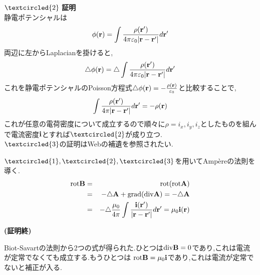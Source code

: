 \documentclass[../main]{subfiles}
\begin{document}
$\textcircled{\scriptsize2}$ {\bf 証明} \\
静電ポテンシャルは
\begin{eqnarray*}
\phi ({\bf r})= \int \frac{\rho({\bf r'})}{4 \pi \varepsilon_0 |{\bf r}-{\bf r'}|}d{\bf r'}
\end{eqnarray*}
両辺に左からLaplacianを掛けると,
\begin{eqnarray*}
\triangle \phi ({\bf r})= \triangle \int \frac{\rho({\bf r'})}{4 \pi \varepsilon_0 |{\bf r}-{\bf r'}|}d{\bf r'}
\end{eqnarray*}
これを静電ポテンシャルのPoisson方程式$\triangle \phi({\bf r}) = - \frac{\rho({\bf r})}{\varepsilon_0}$と比較することで,
\begin{eqnarray*}
\int \frac{\rho({\bf r'})}{4 \pi |{\bf r}-{\bf r'}|}d{\bf r'}= - \rho ({\bf r})
\end{eqnarray*}
これが任意の電荷密度について成立するので順々に$\rho=i_x,i_y,i_z$としたものを組んで電流密度${\bf i}$とすれば$\textcircled{\scriptsize2}$が成り立つ. \\
$\textcircled{\scriptsize 3}$の証明はWebの補遺を参照されたい.

$\textcircled{\scriptsize 1},\textcircled{\scriptsize 2},\textcircled{\scriptsize 3}$を用いてAmp\`ereの法則を導く. \\

\begin{eqnarray*}
{\rm rot}{\bf B}&=&{\rm rot}({\rm rot}{\bf A}) \\
&=&- \triangle {\bf A}+{\rm grad}({\rm div}{\bf A}) = - \triangle {\bf A} \\
&=&- \triangle \frac{\mu_0}{4 \pi} \int \frac{{\bf i}({\bf r'})}{|{\bf r}-{\bf r'}|} d{\bf r'} = \mu_0 {\bf i}({\bf r})
\end{eqnarray*}
\begin{flushright}
{\bf (証明終)}
\end{flushright}
Biot-Savartの法則から2つの式が得られた.ひとつは${\rm div}{\bf B}=0$であり,これは電流が定常でなくても成立する.もうひとつは
${\rm rot}{\bf B}=\mu_0{\bf i}$であり,これは電流が定常でないと補正が入る.
\end{document}
